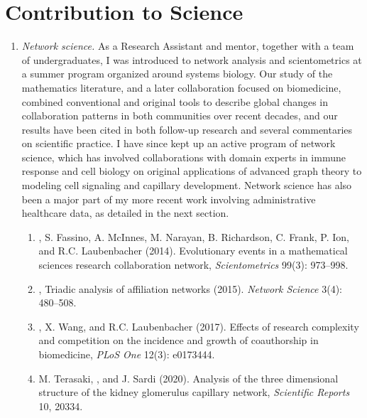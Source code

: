 \documentclass{nihbiosketch}
\begin{document}

\section{Contribution to Science}

\begin{enumerate}

\item \emph{Network science.}
As a Research Assistant and mentor, together with a team of undergraduates, I was introduced to network analysis and scientometrics at a summer program organized around systems biology.
Our study of the mathematics literature, and a later collaboration focused on biomedicine, combined conventional and original tools to describe global changes in collaboration patterns in both communities over recent decades, and our results have been cited in both follow-up research and several commentaries on scientific practice.
I have since kept up an active program of network science, which has involved collaborations with domain experts in immune response and cell biology on original applications of advanced graph theory to modeling cell signaling and capillary development.
Network science has also been a major part of my more recent work involving administrative healthcare data, as detailed in the next section.

\begin{enumerate}
\item {}, S. Fassino, A. McInnes, M. Narayan, B. Richardson, C. Frank, P. Ion, and R.C. Laubenbacher (2014). Evolutionary events in a mathematical sciences research collaboration network, \emph{Scientometrics} 99(3): 973--998.
\item {}, Triadic analysis of affiliation networks (2015). \emph{Network Science} 3(4): 480--508.
\item {}, X. Wang, and R.C. Laubenbacher (2017). Effects of research complexity and competition on the incidence and growth of coauthorship in biomedicine, \emph{PLoS One} 12(3): e0173444.
\item M. Terasaki, , and J. Sardi (2020). Analysis of the three dimensional structure of the kidney glomerulus capillary network, \emph{Scientific Reports} 10, 20334.
\end{enumerate}


\end{enumerate}
\end{document}
